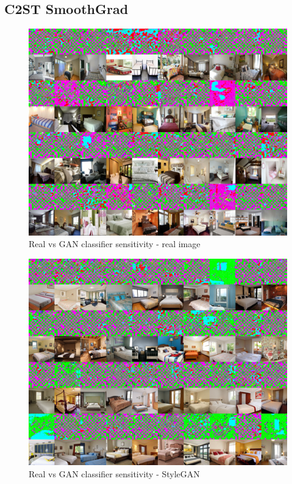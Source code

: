 \documentclass{article}
\begin{document}
    
    \newpage
    \subsection{C2ST SmoothGrad}
    \begin{figure}[H]
          \centering
            \includegraphics[scale=.95]{smoothgrad-big/combined_model/testing-3-2-combined-dataset-raw-smoothgrad.png}
          \caption{Real vs GAN classifier sensitivity - real image}
    \end{figure}
    
    \begin{figure}[H]
      \centering
        \includegraphics[scale=.95]{smoothgrad-big/combined_model/testing-3-2-combined-dataset-stylegan-smoothgrad.png}
     \caption{Real vs GAN classifier sensitivity - StyleGAN}
    \end{figure}
    
\end{document}
